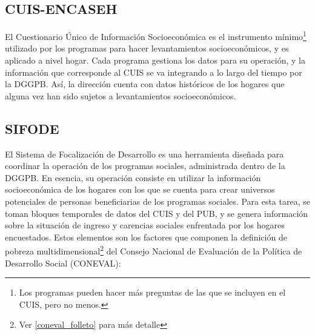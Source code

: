 \subsection*{CUIS-ENCASEH}
El Cuestionario Único de Información Socioeconómica es el instrumento mínimo\footnote{Los programas pueden hacer más preguntas de las que se incluyen en el CUIS, pero no menos.} utilizado por los programas para hacer levantamientos socioeconómicos, y es aplicado a nivel hogar. Cada programa gestiona los datos para su operación, y la información que corresponde al CUIS se va integrando a lo largo del tiempo por la DGGPB. Así, la dirección cuenta con datos históricos de los hogares que alguna vez han sido sujetos a levantamientos socioeconómicos.
\subsection*{SIFODE}
El Sistema de Focalización de Desarrollo es una herramienta diseñada para coordinar la operación de los programas sociales, administrada dentro de la DGGPB. En esencia, su operación consiste en utilizar la información socioeconómica de los hogares con los que se cuenta para crear universos potenciales de personas beneficiarias de los programas sociales. Para esta tarea, se toman bloques temporales de datos del CUIS y del PUB, y se genera información sobre la situación de ingreso y carencias sociales enfrentada por los hogares encuestados. Estos elementos son los factores que componen la definición de pobreza multidimensional\footnote{Ver \ref{coneval_folleto} para más detalle} del Consejo Nacional de Evaluación de la Política de Desarrollo Social (CONEVAL):
